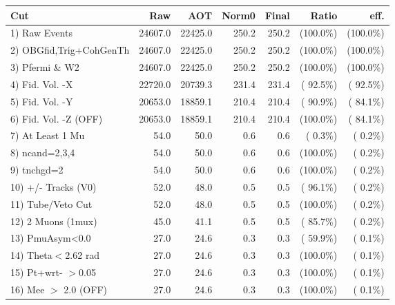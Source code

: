  \begin{table}[h!]\centering
 \begin{tabular}{||l||r|r|r|r|r|r||}
 \hline
 \hline
 Cut & Raw & AOT & Norm0 & Final & Ratio & eff.       \\
 \hline
  1) Raw Events           &      24607.0 &      22425.0 &        250.2 &        250.2 & (100.0\%) & (100.0\%) \\
  2) OBGfid,Trig+CohGenTh &      24607.0 &      22425.0 &        250.2 &        250.2 & (100.0\%) & (100.0\%) \\
  3) Pfermi \& W2         &      24607.0 &      22425.0 &        250.2 &        250.2 & (100.0\%) & (100.0\%) \\
  4) Fid. Vol. -X         &      22720.0 &      20739.3 &        231.4 &        231.4 & ( 92.5\%) & ( 92.5\%) \\
  5) Fid. Vol. -Y         &      20653.0 &      18859.1 &        210.4 &        210.4 & ( 90.9\%) & ( 84.1\%) \\
  6) Fid. Vol. -Z (OFF)   &      20653.0 &      18859.1 &        210.4 &        210.4 & (100.0\%) & ( 84.1\%) \\
  7) At Least 1 Mu        &         54.0 &         50.0 &          0.6 &          0.6 & (  0.3\%) & (  0.2\%) \\
  8) ncand=2,3,4          &         54.0 &         50.0 &          0.6 &          0.6 & (100.0\%) & (  0.2\%) \\
  9) tnchgd=2             &         54.0 &         50.0 &          0.6 &          0.6 & (100.0\%) & (  0.2\%) \\
 10) +/- Tracks (V0)      &         52.0 &         48.0 &          0.5 &          0.5 & ( 96.1\%) & (  0.2\%) \\
 11) Tube/Veto Cut        &         52.0 &         48.0 &          0.5 &          0.5 & (100.0\%) & (  0.2\%) \\
 12) 2 Muons (1mux)       &         45.0 &         41.1 &          0.5 &          0.5 & ( 85.7\%) & (  0.2\%) \\
 13) PmuAsym<0.0          &         27.0 &         24.6 &          0.3 &          0.3 & ( 59.9\%) & (  0.1\%) \\
 14) Theta$<$2.62 rad     &         27.0 &         24.6 &          0.3 &          0.3 & (100.0\%) & (  0.1\%) \\
 15) Pt+wrt- $>$0.05      &         27.0 &         24.6 &          0.3 &          0.3 & (100.0\%) & (  0.1\%) \\
 16) Mee $>$ 2.0  (OFF)   &         27.0 &         24.6 &          0.3 &          0.3 & (100.0\%) & (  0.1\%) \\

\end{tabular}
\end{table}
